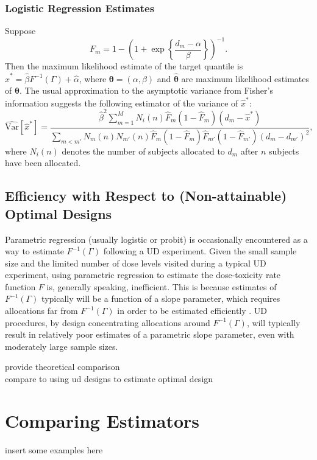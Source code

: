 \subsubsection{Logistic Regression Estimates}
Suppose $$F_m=1-\left(1+\exp\left\{\frac{d_m-\alpha}{\beta}\right\}\right)^{-1}.$$
Then the maximum likelihood estimate of the target quantile is $\widehat x^* =\widehat\beta F^{-1}(\Gamma)+\widehat\alpha$, where $\boldsymbol{\theta}=(\alpha,\beta)$ and $\widehat{ \boldsymbol{\theta}}$ are maximum likelihood estimates of $\boldsymbol{\theta}$.  The usual approximation to the asymptotic variance from Fisher's information suggests the following estimator of the variance of $\widehat x^*$:
\begin{equation}
\widehat{\textrm{Var}}\left[\widehat x^*\right]=\frac{\widehat\beta^2\sum_{m=1}^{M} N_i(n)\widehat{F}_m(1-\widehat{F}_m)(d_m-\widehat x^*)}{\sum_{m<m'}N_m(n)N_{m'}(n)\widehat{F}_m(1-\widehat{F}_m)\widehat{F}_{m'}(1-\widehat{F}_{m'})(d_m-d_{m'})^2},
\end{equation}
where $N_i(n)$ denotes the number of subjects allocated to $d_m$ after $n$ subjects have been allocated.

\subsection{Efficiency  with Respect to (Non-attainable) Optimal Designs}

Parametric regression (usually logistic or probit) is occasionally encountered as a way to estimate $F^{-1}(\Gamma)$ following a UD experiment. Given the small sample size and the limited number of dose levels visited during a typical UD experiment, using parametric regression to estimate the dose-toxicity rate function $F$ is, generally speaking, inefficient.  This is because estimates of $F^{-1}(\Gamma)$ typically will be a function of a slope parameter, which requires allocations far from $F^{-1}(\Gamma)$ in order to be estimated efficiently \citep{Ford:Tors:Wu:use:1992}.  UD procedures, by design concentrating allocations around $F^{-1}(\Gamma)$, will typically result in relatively poor estimates  of a parametric slope parameter, even with moderately large sample sizes.

provide theoretical comparison\\
compare to using ud designs to estimate optimal design

\section{Comparing Estimators}
insert some examples here

